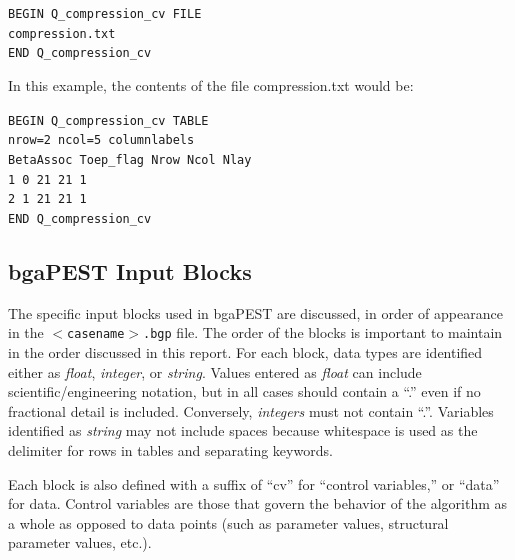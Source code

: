 \documentclass[11pt,oneside,onecolumn]{usgsreport}
\begin{document}
\begin{appendix}
\texttt{BEGIN Q\_compression\_cv FILE }~\\
\texttt{compression.txt}~\\
\texttt{END Q\_compression\_cv}

In this example, the contents of the file compression.txt would be:

\texttt{BEGIN Q\_compression\_cv TABLE }~\\
\texttt{nrow=2 ncol=5 columnlabels }~\\
\texttt{BetaAssoc Toep\_flag Nrow Ncol Nlay }~\\
\texttt{1 0 21 21 1 }~\\
\texttt{2 1 21 21 1 }~\\
\texttt{END Q\_compression\_cv}


\subsection{bgaPEST Input Blocks}

The specific input blocks used in bgaPEST are discussed, in order
of appearance in the \texttt{$<$casename$>$.bgp} file. The order of the
blocks is important to maintain in the order discussed in this report.
For each block, data types are identified either as \emph{float},
\emph{integer}, or \emph{string}. Values entered as \emph{float} can
include scientific/engineering notation, but in all cases should contain
a ``.'' even if no fractional detail is included. Conversely, \emph{integers}
must not contain ``.''. Variables identified as \emph{string} may
not include spaces because whitespace is used as the delimiter for
rows in tables and separating keywords.

Each block is also defined with a suffix of ``cv'' for ``control
variables,'' or ``data'' for data. Control variables are those
that govern the behavior of the algorithm as a whole as opposed to
data points (such as parameter values, structural parameter values,
etc.). 




\end{appendix}
\end{document}
